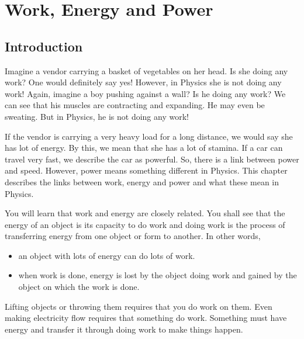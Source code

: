 \chapter{Work, Energy and Power}
\label{p:m:wpe12}


\section{Introduction}
Imagine a vendor carrying a basket of vegetables on her head. Is she doing any work? One would definitely say yes! However, in Physics she is not doing any work! Again, imagine a boy pushing against a wall? Is he doing any work? We can see that his muscles are contracting and expanding. He may even be sweating. But in Physics, he is not doing any work!

If the vendor is carrying a very heavy load for a long distance, we would say she has lot of energy. By this, we mean that she has a lot of stamina. If a car can travel very fast, we describe the car as powerful. So, there is a link between power and speed. However, power means something different in Physics. This chapter describes the links between work, energy and power and what these mean in Physics.

You will learn that work and energy are closely related. You shall see that the energy of an object is its capacity to do work and doing work is the process of transferring energy from one object or form to another. In other
words,

\begin{itemize}
\item{an object with lots of energy can do lots of work.}
\item{when work is done, energy is lost by the object doing work and gained by the object on which the work is done.}
\end{itemize}

Lifting objects or throwing them requires that you do work on them. Even making electricity flow requires that something do work. Something must have energy and transfer it through doing work to make things happen.\\
